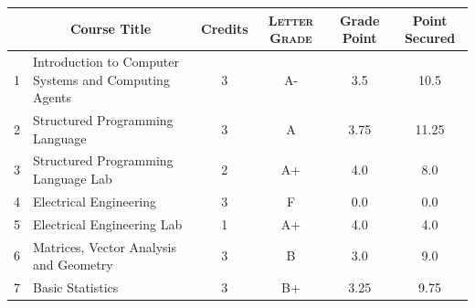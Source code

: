 \documentclass[11pt]{article}
\newcommand*{\numtwo}[1]{\pgfmathprintnumber[
                    fixed, precision=2, fixed zerofill=true]{#1}}
\begin{document}
                \begin{center}
                    \renewcommand{\arraystretch}{1.08}
                    
                \begin{tabular}{|c|l|c|>{\scshape}c|c|c|}
                \hline  \rule[-1ex]{0pt}{3.5ex} {\centering{\bf Course Code}} &  \multicolumn{1}{c|}{\textbf{Course Title}}  & {\bf Credits} & {\bf Letter Grade} & {\bf Grade Point} & {\bf Point Secured}  \\ 
                \hline   1 &  Introduction to Computer Systems and Computing Agents		 & 3 & A- & 3.5 & 10.5 \\ %
                \hline   2 &  Structured Programming Language		 & 3 & A & 3.75 & 11.25 \\ %
                \hline   3 &  Structured Programming Language Lab		 & 2 & A+ & 4.0 & 8.0 \\ %
                \hline   4 &  Electrical Engineering		 & 3 & F & 0.0 & 0.0 \\ %
                \hline   5 &  Electrical Engineering Lab		 & 1 & A+ & 4.0 & 4.0 \\ %
                \hline   6 &  Matrices, Vector Analysis and Geometry		 & 3 & B & 3.0 & 9.0 \\ %
                \hline   7 &  Basic Statistics		 & 3 & B+ & 3.25 & 9.75 \\ %

\hline                %
                \end{tabular}
                \end{center}
                \renewcommand{\arraystretch}{1.03}
\end{document}
